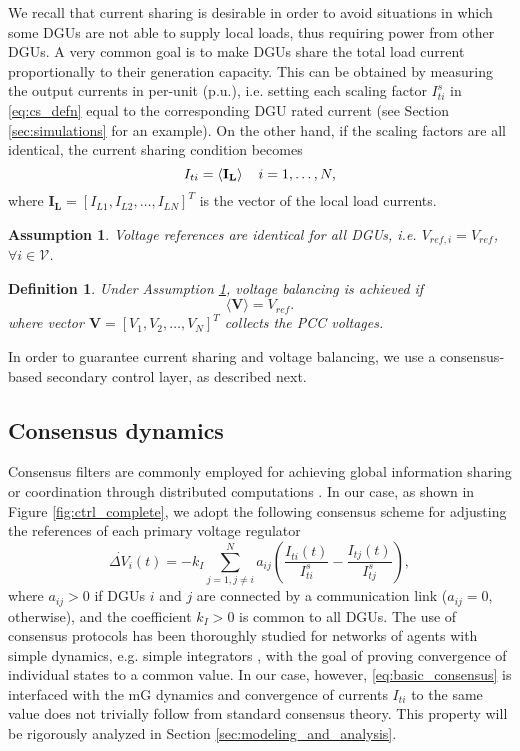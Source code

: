 \documentclass[a4paper]{article}
\theoremstyle{plain}
\newtheorem{ass}{Assumption}
\newtheorem{definition}{Definition}
\begin{document}
We recall that current sharing is desirable in order to avoid
situations in which some DGUs are not able to supply local
loads, thus requiring power from other DGUs. A very common goal is to make DGUs share the total load
current proportionally to their generation capacity. This can be obtained by measuring the output currents
in per-unit (p.u.), i.e. setting each scaling factor $I_{ti}^s$ in \eqref{eq:cs_defn} equal to the corresponding DGU rated current (see Section \ref{sec:simulations} for an example).
On the other hand, if the scaling factors are all identical, the current sharing condition becomes
\begin{equation}
\label{eqn:equal_sharing}
I_{ti} = \langle\mathbf{{I}_L}\rangle\hspace{4mm}i = 1, \dots,N,
\end{equation}
where $\mathbf{I_L} = [I_{L1}, I_{L2}, \dots, I_{LN}]^T$ is the vector of the local load currents.

\begin{ass}
	\label{ass:vref}
	Voltage references are identical for all DGUs, i.e. $V_{ref,i}=V_{ref}$, $\forall i\in\mathcal{V}$.
\end{ass}
\begin{definition}
	\label{defn:vb}
	Under Assumption \ref{ass:vref}, \textit{voltage balancing} is achieved if 
	\begin{equation}
	\label{eq:vb_defn}
	\langle\mathbf{V}\rangle = V_{ref}.
	\end{equation}
	where vector $\mathbf{V} =[V_{1},V_{2}, \dots,V_{N}]^T$ collects the PCC voltages.
\end{definition}

In order to guarantee current sharing and voltage balancing, we use a consensus-based secondary
control layer, as described next. 
\subsection{Consensus dynamics}
Consensus filters are commonly employed for achieving
global information sharing or coordination through distributed
computations \cite{olfati2004consensus,lns-v.85}. In our case, as
shown in Figure \ref{fig:ctrl_complete}, we adopt the following
consensus scheme for adjusting the references of each primary voltage regulator
\begin{equation}
\label{eq:basic_consensus}
\dot {\Delta V_i}(t) =- k_{I}\sum\limits_{j=1, j\neq i} ^{N}a_{ij}\left(\frac{I_{ti}(t)}{I_{ti}^s}-\frac{I_{tj}(t)}{I_{tj}^s}\right),
\end{equation}
where $a_{ij}>0$ if DGUs $i$ and $j$ are connected by a communication
link ($a_{ij}=0$, otherwise), and the coefficient $k_I>0$ is
common to all DGUs. The use of consensus protocols has been thoroughly
studied for networks of agents with simple dynamics, e.g. simple
integrators \cite{olfati2004consensus,lns-v.85}, with the goal of
proving convergence of individual states to a common value. In our
case, however, \eqref{eq:basic_consensus} is interfaced with the mG dynamics and convergence
of currents $I_{ti}$ to the same value does not trivially follow from
standard consensus theory. This property will be rigorously analyzed in Section
\ref{sec:modeling_and_analysis}. 
\end{document}
